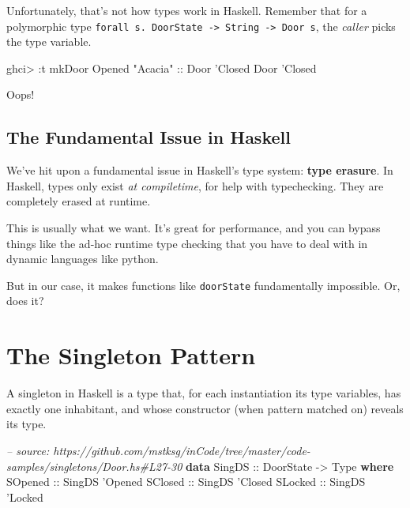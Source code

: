 \documentclass[]{article}
\newenvironment{Shaded}{}{}
\newcommand{\KeywordTok}[1]{\textcolor[rgb]{0.00,0.44,0.13}{\textbf{#1}}}
\newcommand{\DataTypeTok}[1]{\textcolor[rgb]{0.56,0.13,0.00}{#1}}
\newcommand{\CharTok}[1]{\textcolor[rgb]{0.25,0.44,0.63}{#1}}
\newcommand{\StringTok}[1]{\textcolor[rgb]{0.25,0.44,0.63}{#1}}
\newcommand{\CommentTok}[1]{\textcolor[rgb]{0.38,0.63,0.69}{\textit{#1}}}
\newcommand{\OtherTok}[1]{\textcolor[rgb]{0.00,0.44,0.13}{#1}}
\newcommand{\FunctionTok}[1]{\textcolor[rgb]{0.02,0.16,0.49}{#1}}
\newcommand{\NormalTok}[1]{#1}
\begin{document}
Unfortunately, that's not how types work in Haskell. Remember that for a
polymorphic type
\texttt{forall\ s.\ DoorState\ -\textgreater{}\ String\ -\textgreater{}\ Door\ s},
the \emph{caller} picks the type variable.

\begin{Shaded}
\begin{Highlighting}[]
\NormalTok{ghci}\FunctionTok{>} \FunctionTok{:}\NormalTok{t mkDoor }\DataTypeTok{Opened} \StringTok{"Acacia"}\OtherTok{ ::} \DataTypeTok{Door} \CharTok{'Closed}
\DataTypeTok{Door} \CharTok{'Closed}
\end{Highlighting}
\end{Shaded}

Oops!

\subsection{The Fundamental Issue in
Haskell}\label{the-fundamental-issue-in-haskell}

We've hit upon a fundamental issue in Haskell's type system: \textbf{type
erasure}. In Haskell, types only exist \emph{at compiletime}, for help with
typechecking. They are completely erased at runtime.

This is usually what we want. It's great for performance, and you can bypass
things like the ad-hoc runtime type checking that you have to deal with in
dynamic languages like python.

But in our case, it makes functions like \texttt{doorState} fundamentally
impossible. Or, does it?

\section{The Singleton Pattern}\label{the-singleton-pattern}

A singleton in Haskell is a type that, for each instantiation its type
variables, has exactly one inhabitant, and whose constructor (when pattern
matched on) reveals its type.

\begin{Shaded}
\begin{Highlighting}[]
\CommentTok{-- source: https://github.com/mstksg/inCode/tree/master/code-samples/singletons/Door.hs#L27-30}
\KeywordTok{data} \DataTypeTok{SingDS}\OtherTok{ ::} \DataTypeTok{DoorState} \OtherTok{->} \DataTypeTok{Type} \KeywordTok{where}
    \DataTypeTok{SOpened}\OtherTok{ ::} \DataTypeTok{SingDS} \CharTok{'Opened}
    \DataTypeTok{SClosed}\OtherTok{ ::} \DataTypeTok{SingDS} \CharTok{'Closed}
    \DataTypeTok{SLocked}\OtherTok{ ::} \DataTypeTok{SingDS} \CharTok{'Locked}
\end{Highlighting}
\end{Shaded}
\end{document}
